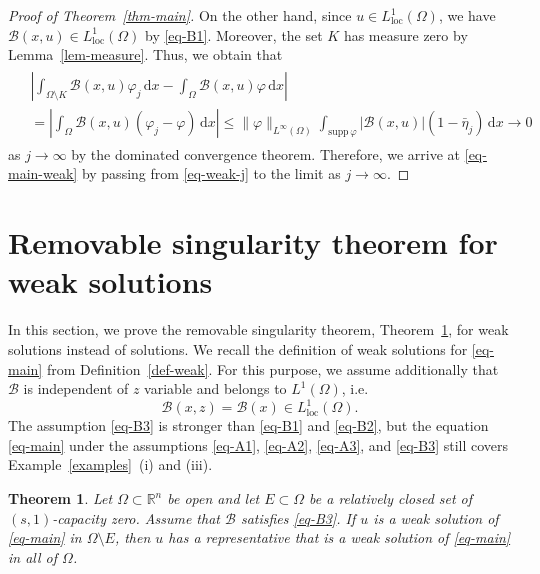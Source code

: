\documentclass{amsart}
\theoremstyle{plain}
\newtheorem{theorem}{Theorem}[section]
\theoremstyle{definition}
\numberwithin{equation}{section}
\begin{document}
\begin{proof}[Proof of Theorem~\ref{thm-main}]
On the other hand, since $u \in L^1_{\mathrm{loc}}(\Omega)$, we have $\mathscr{B}(x, u) \in L^1_{\mathrm{loc}}(\Omega)$ by \eqref{eq-B1}. Moreover, the set $K$ has measure zero by Lemma~\ref{lem-measure}. Thus, we obtain that
\begin{align}\label{eq-step3-B}
\begin{split}
&\left| \int_{\Omega \setminus K} \mathscr{B}(x, u)\varphi_j \,\mathrm{d}x - \int_{\Omega} \mathscr{B}(x, u)\varphi \,\mathrm{d}x \right| \\
&= \left| \int_{\Omega} \mathscr{B}(x, u)(\varphi_j-\varphi) \,\mathrm{d}x \right| \leq \|\varphi\|_{L^\infty(\Omega)} \int_{\mathrm{supp}\,\varphi} |\mathscr{B}(x, u)| (1-\bar{\eta}_j) \,\mathrm{d}x \to 0
\end{split}
\end{align}
as $j \to \infty$ by the dominated convergence theorem. Therefore, we arrive at \eqref{eq-main-weak} by passing from \eqref{eq-weak-j} to the limit as $j \to \infty$.
\end{proof}

\section{Removable singularity theorem for weak solutions}\label{sec-weak}

In this section, we prove the removable singularity theorem, Theorem~\ref{thm-main-weak}, for weak solutions instead of solutions. We recall the definition of weak solutions for \eqref{eq-main} from Definition~\ref{def-weak}. For this purpose, we assume additionally that $\mathscr{B}$ is independent of $z$ variable and belongs to $L^1(\Omega)$, i.e.\
\begin{equation}\label{eq-B3}
\mathscr{B}(x, z)=\mathscr{B}(x) \in L^1_{\mathrm{loc}}(\Omega).
\end{equation}
The assumption \eqref{eq-B3} is stronger than \eqref{eq-B1} and \eqref{eq-B2}, but the equation \eqref{eq-main} under the assumptions \eqref{eq-A1}, \eqref{eq-A2}, \eqref{eq-A3}, and \eqref{eq-B3} still covers Example~\ref{examples}~(i) and (iii).

\begin{theorem}\label{thm-main-weak}
Let $\Omega \subset \mathbb{R}^n$ be open and let $E \subset \Omega$ be a relatively closed set of $(s, 1)$-capacity zero. Assume that $\mathscr{B}$ satisfies \eqref{eq-B3}. If $u$ is a weak solution of \eqref{eq-main} in $\Omega \setminus E$, then $u$ has a representative that is a weak solution of \eqref{eq-main} in all of $\Omega$.
\end{theorem}
\end{document}
